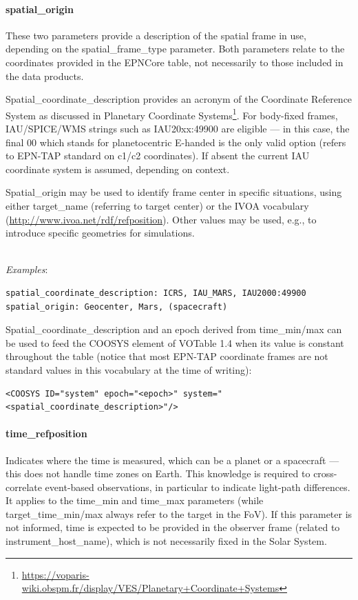 \documentclass[11pt,a4paper]{ivoa}
\begin{document}
\paragraph{spatial\_origin}

These two parameters provide a description of the spatial frame in use,
depending on the spatial\_frame\_type parameter. Both parameters relate
to the coordinates provided in the EPNCore table, not necessarily to
those included in the data products.

Spatial\_coordinate\_description provides an acronym of the
Coordinate Reference System as discussed in Planetary Coordinate
Systems\footnote{\url{https://voparis-wiki.obspm.fr/display/VES/Planetary+Coordinate+Systems}}.
For body-fixed frames, IAU/SPICE/WMS strings such as IAU20xx:49900 are
eligible --- in this case, the final 00 which stands for planetocentric
E-handed is the only valid option (refers to EPN-TAP standard on c1/c2
coordinates). If absent the current IAU coordinate system is assumed,
depending on context.

Spatial\_origin may be used to identify frame center
in specific situations, using either target\_name
(referring to target center) or the IVOA vocabulary
(\url{http://www.ivoa.net/rdf/refposition}).
Other values may be used, e.g., to introduce specific geometries for
simulations.

\textbf{\\}
\emph{Examples}:

\begin{verbatim}
spatial_coordinate_description: ICRS, IAU_MARS, IAU2000:49900
spatial_origin: Geocenter, Mars, (spacecraft)
\end{verbatim}


Spatial\_coordinate\_description and an epoch derived from time\_min/max
can be used to feed the COOSYS element of VOTable 1.4 when its value
is constant throughout the table (notice that most EPN-TAP coordinate
frames are not standard values in this vocabulary at the time of writing):

\begin{verbatim}
<COOSYS ID="system" epoch="<epoch>" system="<spatial_coordinate_description>"/>
\end{verbatim}

\paragraph{time\_refposition}

Indicates where the time is measured, which can be a planet or a
spacecraft — this does not handle time zones on Earth. This knowledge
is required to cross-correlate event-based observations, in particular
to indicate light-path differences. It applies to the time\_min and
time\_max parameters (while target\_time\_min/max always refer to the
target in the FoV). If this parameter is not informed, time is expected
to be provided in the observer frame (related to instrument\_host\_name),
which is not necessarily fixed in the Solar System.
\end{document}

